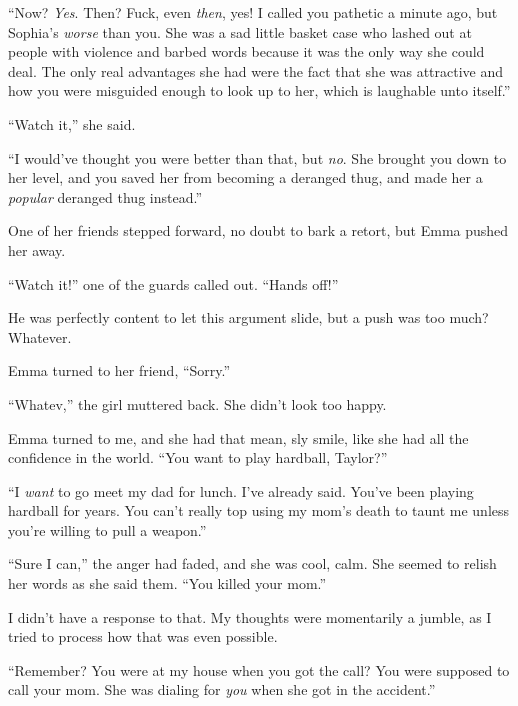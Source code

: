 ``Now?  \emph{Yes}.  Then?  Fuck, even \emph{then}, yes!  I called you pathetic a minute ago, but Sophia's \emph{worse} than you.  She was a sad little basket case who lashed out at people with violence and barbed words because it was the only way she could deal.  The only real advantages she had were the fact that she was attractive and how you were misguided enough to look up to her, which is laughable unto itself.''



``Watch it,'' she said.



``I would've thought you were better than that, but \emph{no}.  She brought you down to her level, and you saved her from becoming a deranged thug, and made her a \emph{popular }deranged thug instead.''



One of her friends stepped forward, no doubt to bark a retort, but Emma pushed her away.



``Watch it!'' one of the guards called out.  ``Hands off!''



He was perfectly content to let this argument slide, but a push was too much?  Whatever.



Emma turned to her friend, ``Sorry.''



``Whatev,'' the girl muttered back.  She didn't look too happy.



Emma turned to me, and she had that mean, sly smile, like she had all the confidence in the world.  ``You want to play hardball, Taylor?''



``I \emph{want} to go meet my dad for lunch.  I've already said.  You've been playing hardball for years.  You can't really top using my mom's death to taunt me unless you're willing to pull a weapon.''



``Sure I can,'' the anger had faded, and she was cool, calm.  She seemed to relish her words as she said them.  ``You killed your mom.''



I didn't have a response to that.  My thoughts were momentarily a jumble, as I tried to process how that was even possible.



``Remember?  You were at my house when you got the call?  You were supposed to call your mom.  She was dialing for \emph{you} when she got in the accident.''



